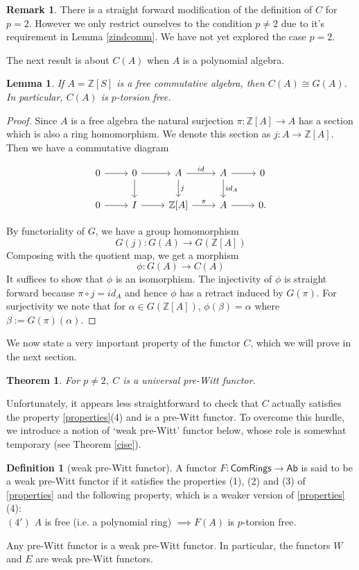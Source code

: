 \documentclass[10pt]{amsart}
\theoremstyle{plain}
\newtheorem{theorem}[thm]{Theorem}
\newtheorem{lemma}[thm]{Lemma}
\theoremstyle{definition}
\newtheorem{remark}[thm]{Remark}
\newtheorem{definition}[thm]{Definition}
\newcommand{\Z}{{\mathbb Z}}
\newcommand{\Com}{{\mathsf{ComRings}}}
\begin{document}
\begin{remark}
There is a straight forward modification of the definition of $C$ for $p=2$. However we only restrict ourselves to the condition $p\neq 2$ due to it's requirement in Lemma \ref{zindcomm}. We have not yet explored the case $p=2$.
\end{remark}

\noindent The next result is about $C(A)$ when $A$ is a polynomial algebra. 
\begin{lemma}\label{ceqg}
If $A=\Z[S]$ is a free commutative algebra, then $C(A) \cong G(A)$. In particular, $C(A)$ is $p$-torsion free.
\end{lemma}
\begin{proof}
Since $A$ is a free algebra the natural surjection $\pi: \Z[A] \to A$ has a section which is also a ring homomorphism. We denote this section as $j : A \to \Z[A]$. Then we have a commutative diagram 

\[
\begin{tikzcd}
  0 \arrow[r] & 0 \arrow[d] \arrow[r] & A \arrow[d, "j"] \arrow[r, "id"] & A \arrow[d, "id_A"] \arrow[r] & 0 \\
  0 \arrow[r] & I \arrow[r] & \Z[A] \arrow[r, "\pi"] & A \ar[r] & 0.
\end{tikzcd}
\]

\noindent By functoriality of $G$, we have a group homomorphism $$G(j): G(A) \to G(\Z[A])$$ 
Composing with the quotient map, we get a morphism $$\phi: G(A) \to C(A)$$
It suffices to show that $\phi$ is an isomorphism.  The injectivity of $\phi$ is straight forward because $\pi \circ j = id_A$ and hence $\phi$ has a retract induced by $G(\pi)$. For surjectivity we note that for $\alpha \in G(\Z[A])$, $\phi(\beta)=\alpha$ where $\beta:=G(\pi)(\alpha)$. 
\end{proof}

\noindent We now state a very important property of the functor $C$, which we will prove in the next section.
\begin{theorem} For $p\neq 2$, $C$ is a universal pre-Witt functor. 
\end{theorem}
\noindent Unfortunately, it appears less straightforward to check that $C$ actually satisfies the property \ref{properties}(4) and is a pre-Witt functor. To overcome this hurdle, we introduce a notion of `weak pre-Witt' functor below, whose role is somewhat temporary (see Theorem \ref{cise}).
\begin{definition}[weak pre-Witt functor]\label{defweakpre} A functor $F: \Com \to  \mathsf{Ab}$ is said to be a weak pre-Witt functor if it satisfies the properties (1), (2) and (3) of \ref{properties} and the following property, which is a weaker version of  \ref{properties}(4): \\

$(4')$ $A$ is  free (i.e. a polynomial ring)  $\implies F(A)$ is $p$-torsion free.
\end{definition} 
\vspace{1mm}
\noindent Any pre-Witt functor is a weak pre-Witt functor. In particular, the functors $W$ and $E$ are weak pre-Witt functors. 
 
\end{document}
